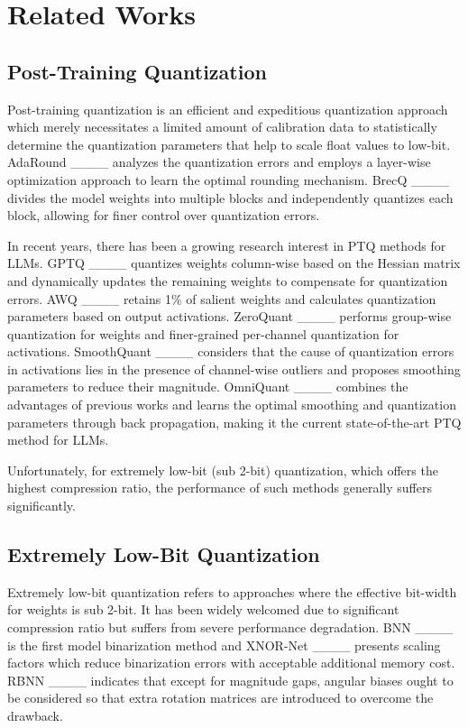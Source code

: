 \section{Related Works}
\subsection{Post-Training Quantization}
Post-training quantization is an efficient and expeditious quantization approach which merely necessitates a limited amount of calibration data to statistically determine the quantization parameters that help to scale float values to low-bit. AdaRound ____ analyzes the quantization errors and employs a layer-wise optimization approach to learn the optimal rounding mechanism. BrecQ ____ divides the model weights into multiple blocks and independently quantizes each block, allowing for finer control over quantization errors.

In recent years, there has been a growing research interest in PTQ methods for LLMs. GPTQ ____ quantizes weights column-wise based on the Hessian matrix and dynamically updates the remaining weights to compensate for quantization errors. AWQ ____ retains 1\% of salient weights and calculates quantization parameters based on output activations. ZeroQuant ____ performs group-wise quantization for weights and finer-grained per-channel quantization for activations. SmoothQuant ____ considers that the cause of quantization errors in activations lies in the presence of channel-wise outliers and proposes smoothing parameters to reduce their magnitude. OmniQuant ____ combines the advantages of previous works and learns the optimal smoothing and quantization parameters through back propagation, making it the current state-of-the-art PTQ method for LLMs.

Unfortunately, for extremely low-bit (sub 2-bit) quantization, which offers the highest compression ratio, the performance of such methods generally suffers significantly. 



\subsection{Extremely Low-Bit Quantization}

Extremely low-bit quantization refers to approaches where the effective bit-width for weights is sub 2-bit. It has been widely welcomed due to significant compression ratio but suffers from severe performance degradation. BNN ____ is the first model binarization method and %
XNOR-Net ____ presents scaling factors which reduce binarization errors with acceptable additional memory cost. RBNN ____ indicates that except for magnitude gaps, angular biases ought to be considered so that extra rotation matrices are introduced to overcome the drawback.

